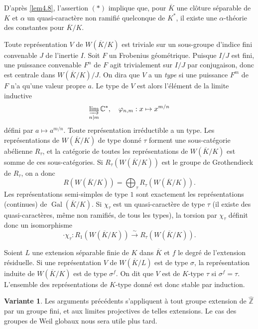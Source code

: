 \documentclass[11pt,a4paper]{amsart}
\theoremstyle{plain}
\theoremstyle{definition}
\newtheorem{variant}[theorem]{Variante}
\DeclareMathOperator{\Gal}{Gal}
\newcommand{\dbZ}{\mathbb{Z}}
\newcommand{\dbC}{\mathbb{C}}
\newenvironment{para}{\par\noindent}{\par}
\newenvironment{variante}{\begin{variant}}{\end{variant}}
\newcommand{\ov}[1]{\overline{#1}}
\newcommand{\isom}{\xrightarrow{\sim}}
\begin{document}
D'apr\`es \ref{lem4.8}, l'assertion $(*)$ implique que, pour $\ov{K}$ une cl\^oture s\'eparable de $K$ et $\alpha$ un quasi-caract\`ere non ramifi\'e quelconque de $K^{*}$, il existe une $\alpha$-th\'eorie des constantes pour $\ov{K}/K$.

\begin{para}
Toute repr\'esentation $V$ de $W(\ov{K}/K)$ est triviale sur un sous-groupe d'indice fini convenable $J$ de l'inertie $I$. Soit $F$ un Frobenius g\'eom\'etrique. Puisque $I/J$ est fini, une puissance convenable $F^{n}$ de $F$ agit trivialement sur $I/J$ par conjugaison, donc est centrale dans $W(\ov{K}/K)/J$. On dira que $V$ a un \emph{type} si une puissance $F^{m}$ de $F$ n'a qu'une valeur propre $a$. Le type de $V$ est alors l'\'el\'ement de la limite inductive
\[
\varinjlim_{n|m} \dbC^{*}, \quad \varphi_{n,m}: x \mapsto x^{m/n}
\]
d\'efini par $a \mapsto a^{m/n}$. Toute repr\'esentation irr\'eductible a un type. Les repr\'esentations de $W(\ov{K}/K)$ de type donn\'e $\tau$ forment une sous-cat\'egorie ab\'elienne $R_{\tau}$, et la cat\'egorie de toutes les repr\'esentations de $W(\ov{K}/K)$ est somme de ces sous-cat\'egories. Si $R_{\tau}(W(\ov{K}/K))$ est le groupe de Grothendieck de $R_{\tau}$, on a donc
\begin{equation}\label{eq4.10.1}
R(W(\ov{K}/K)) = \bigoplus_{\tau} R_{\tau}(W(\ov{K}/K)).
\end{equation}
Les repr\'esentations semi-simples de type $1$ sont exactement les repr\'esentations (continues) de $\Gal(\ov{K}/K)$. Si $\chi_{\tau}$ est un quasi-caract\`ere de type $\tau$ (il existe des quasi-caract\`eres, m\^eme non ramifi\'es, de tous les types), la torsion par $\chi_{\tau}$ d\'efinit donc un isomorphisme
\begin{equation}\label{eq4.10.2}
\cdot \chi_{\tau}: R_{1}(W(\ov{K}/K)) \isom R_{\tau}(W(\ov{K}/K)).
\end{equation}
\end{para}

\begin{para}
Soient $L$ une extension s\'eparable finie de $K$ dans $\ov{K}$ et $f$ le degr\'e de l'extension r\'esiduelle. Si une repr\'esentation $V$ de $W(\ov{K}/L)$ est de type $\sigma$, la repr\'esentation induite de $W(\ov{K}/K)$ est de type $\sigma^{f}$. On dit que $V$ est de $K$-type $\tau$ si $\sigma^{f} = \tau$. L'ensemble des repr\'esentations de $K$-type donn\'e est donc stable par induction.
\end{para}

\begin{variante}
Les arguments pr\'ec\'edents s'appliquent \`a tout groupe extension de $\hat{\dbZ}$ par un groupe fini, et aux limites projectives de telles extensions. Le cas des groupes de Weil globaux nous sera utile plus tard.
\end{variante}
\end{document}
